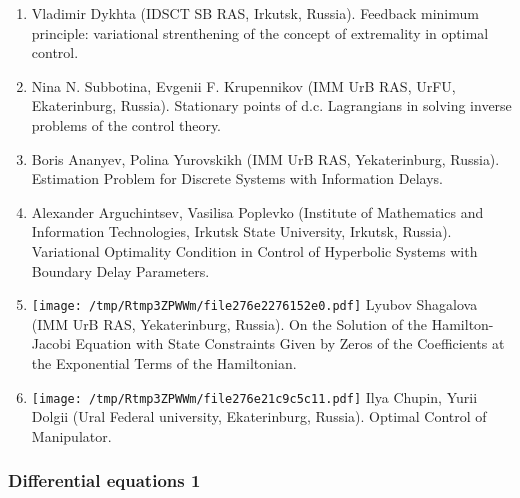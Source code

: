 \documentclass[
]{article}
\providecommand{\tightlist}{%
  \setlength{\itemsep}{0pt}\setlength{\parskip}{0pt}}
\begin{document}
\begin{enumerate}
\def\labelenumi{\arabic{enumi}.}
\tightlist
\item
  Vladimir Dykhta (IDSCT SB RAS, Irkutsk, Russia). Feedback minimum
  principle: variational strenthening of the concept of extremality in
  optimal control.
\item
  Nina N. Subbotina, Evgenii F. Krupennikov (IMM UrB RAS, UrFU,
  Ekaterinburg, Russia). Stationary points of d.c. Lagrangians in
  solving inverse problems of the control theory.
\item
  Boris Ananyev, Polina Yurovskikh (IMM UrB RAS, Yekaterinburg, Russia).
  Estimation Problem for Discrete Systems with Information Delays.
\item
  Alexander Arguchintsev, Vasilisa Poplevko (Institute of Mathematics
  and Information Technologies, Irkutsk State University, Irkutsk,
  Russia). Variational Optimality Condition in Control of Hyperbolic
  Systems with Boundary Delay Parameters.
\item
  \protect\texttt{[image: /tmp/Rtmp3ZPWWm/file276e2276152e0.pdf]}
  Lyubov Shagalova (IMM UrB RAS, Yekaterinburg, Russia). On the Solution
  of the Hamilton-Jacobi Equation with State Constraints Given by Zeros
  of the Coefficients at the Exponential Terms of the Hamiltonian.
\item
  \protect\texttt{[image: /tmp/Rtmp3ZPWWm/file276e21c9c5c11.pdf]}
  Ilya Chupin, Yurii Dolgii (Ural Federal university, Ekaterinburg,
  Russia). Optimal Control of Manipulator.
\end{enumerate}

\hypertarget{de1}{%
\subsubsection{Differential equations 1}\label{de1}}
\end{document}
